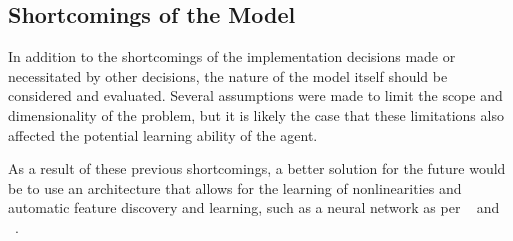 
\subsection{Shortcomings of the Model}
\label{sec:disc-shortcomings}

In addition to the shortcomings of the implementation decisions made or
necessitated by other decisions,
the nature of the model itself should be considered and evaluated.
%
Several assumptions were made to limit the scope and dimensionality of the
problem,
but it is likely the case that these limitations also affected the
potential learning ability of the agent.






As a result of these previous shortcomings,
a better solution for the future would be to use an architecture that allows
for the learning of nonlinearities and automatic feature discovery and
learning,
such as a neural network
as per ~\cite{deepmind_alphago} and ~\cite{tdgammon}.

